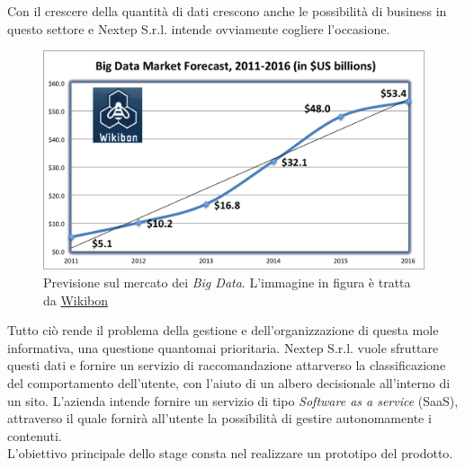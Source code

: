 Con il crescere della quantità di dati crescono anche le possibilità di business in questo settore e Nextep S.r.l. intende ovviamente cogliere l'occasione.
\newpage
\begin{figure}[h]
	\centering
	\includegraphics[width=0.8\linewidth]{immagini/BigDataMarketForecast2011-2016}
	\caption[Previsione sul mercato dei Big Data]{Previsione sul mercato dei \textit{Big Data}. L'immagine in figura è tratta da \href{http://wikibon.org/}{Wikibon}}
	\label{fig:BigDataMarketForecast2011-2016}
\end{figure}
Tutto ciò rende il problema della gestione e dell'organizzazione di questa mole informativa, una questione quantomai prioritaria. Nextep S.r.l. vuole sfruttare questi dati e fornire un servizio di raccomandazione attarverso la classificazione del comportamento dell'utente, con l'aiuto di un albero decisionale all'interno di un sito. L'azienda intende fornire un servizio di tipo \textit{Software as a service} (SaaS), attraverso il quale fornirà all'utente la possibilità di gestire autonomamente i contenuti.\\
L'obiettivo principale dello stage consta nel realizzare un prototipo del prodotto.

